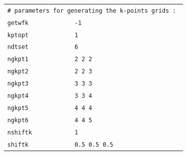 \documentclass[11pt,a4paper]{article}
\begin{document}
\begin{center}
\begin{tabular}{lll}
\multicolumn{3}{l}{\texttt{\# parameters for generating the k-points grids : }}\\
\texttt{getwfk} & \texttt{-1}&\\
\texttt{kptopt} & \texttt{1} &\\
\texttt{ndtset} & \texttt{6}&\\
\texttt{ngkpt1} & \texttt{2 2 2}&\\
\texttt{ngkpt2} & \texttt{2 2 3}&\\
\texttt{ngkpt3} & \texttt{3 3 3}&\\
\texttt{ngkpt4} & \texttt{3 3 4}&\\
\texttt{ngkpt5} & \texttt{4 4 4}&\\
\texttt{ngkpt6} & \texttt{4 4 5}&\\
\texttt{nshiftk} &\texttt{1}&\\
\texttt{shiftk} &\texttt{0.5 0.5 0.5}&
\end{tabular}
\end{center} 
\newpage
\end{document}
